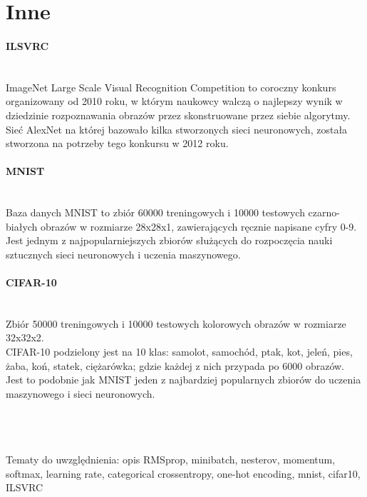\section{Inne}

\paragraph{ILSVRC} \mbox{}\\
ImageNet Large Scale Visual Recognition Competition to coroczny konkurs organizowany
od 2010 roku, w którym naukowcy walczą o najlepszy wynik w dziedzinie rozpoznawania
obrazów przez skonstruowane przez siebie algorytmy. Sieć AlexNet na której bazowało
kilka stworzonych sieci neuronowych, została stworzona na potrzeby tego konkursu
w 2012 roku.

\paragraph{MNIST} \mbox{}\\
Baza danych MNIST to zbiór 60000 treningowych i 10000 testowych czarno-białych obrazów
w rozmiarze 28x28x1, zawierających ręcznie napisane cyfry 0-9. Jest jednym z
najpopularniejszych zbiorów służących do rozpoczęcia nauki sztucznych sieci neuronowych
i uczenia maszynowego.

\paragraph{CIFAR-10} \mbox{}\\
Zbiór 50000 treningowych i 10000 testowych kolorowych obrazów w rozmiarze 32x32x2.\\
CIFAR-10 podzielony jest na 10 klas: samolot, samochód, ptak, kot, jeleń, pies, żaba,
koń, statek, ciężarówka; gdzie każdej z nich przypada po 6000 obrazów. Jest to podobnie
jak MNIST jeden z najbardziej popularnych zbiorów do uczenia maszynowego i sieci neuronowych.


\\\\\\

Tematy do uwzględnienia:
opis RMSprop,
minibatch,
nesterov,
momentum,
softmax,
learning rate,
categorical crossentropy,
one-hot encoding,
mnist, cifar10, ILSVRC
